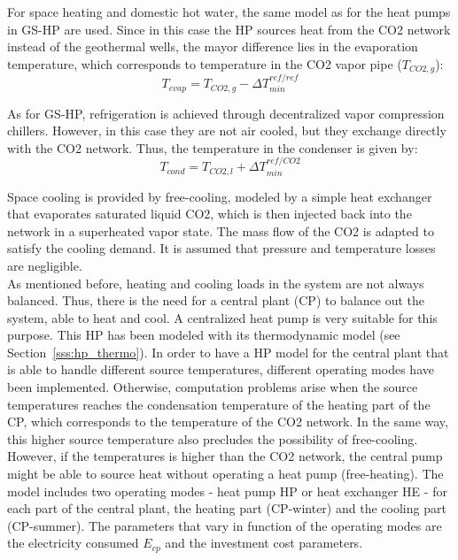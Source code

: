 \documentclass{article}
\begin{document}


For space heating and domestic hot water, the same model as for the heat pumps in GS-HP are used. Since in this case the HP sources heat from the CO2 network instead of the geothermal wells, the mayor difference lies in the evaporation temperature, which corresponds to temperature in the CO2 vapor pipe ($T_{CO2,g}$):
\begin{equation}
    T_{evap} = T_{CO2,g} - \Delta T_{min}^{ref/ref}
\end{equation}

As for GS-HP, refrigeration is achieved through decentralized vapor compression chillers. However, in this case they are not air cooled, but they exchange directly with the CO2 network. Thus, the temperature in the condenser is given by:
\begin{equation}
    T_{cond} = T_{CO2,l} + \Delta T_{min}^{ref/CO2}
\end{equation}

Space cooling is provided by free-cooling, modeled by a simple heat exchanger that evaporates saturated liquid CO2, which is then injected back into the network in a superheated vapor state. The mass flow of the CO2 is adapted to satisfy the cooling demand. It is assumed that pressure and temperature losses are negligible.\\

As mentioned before, heating and cooling loads in the system are not always balanced. Thus, there is the need for a central plant (CP) to balance out the system, able to heat and cool. A centralized heat pump is very suitable for this purpose. This HP has been modeled with its thermodynamic model (see Section~\ref{sss:hp_thermo}).
In order to have a HP model for the central plant that is able to handle different source temperatures, different operating modes have been implemented. Otherwise, computation problems arise when the source temperatures reaches the condensation temperature of the heating part of the CP, which corresponds to the temperature of the CO2 network. In the same way, this higher source temperature also precludes the possibility of free-cooling. However, if the temperatures is higher than the CO2 network, the central pump might be able to source heat without operating a heat pump (free-heating). The model includes two operating modes - heat pump HP or heat exchanger HE - for each part of the central plant, the heating part (CP-winter) and the cooling part (CP-summer). The parameters that vary in function of the operating modes are the electricity consumed $E_{cp}$ and the investment cost parameters. 
\end{document}
